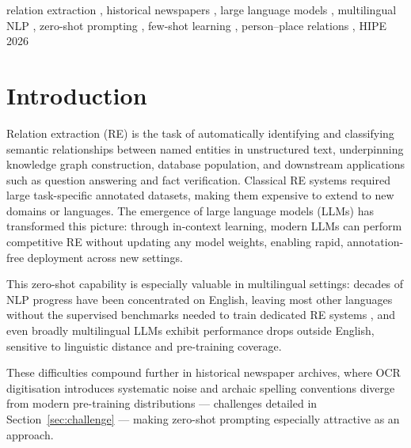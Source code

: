 \documentclass[
]{ceurart}
\theoremstyle{definition}
\begin{document}
\begin{keywords}
  relation extraction \sep
  historical newspapers \sep
  large language models \sep
  multilingual NLP \sep
  zero-shot prompting \sep
  few-shot learning \sep
  person--place relations \sep
  HIPE 2026
\end{keywords}

\maketitle
\thispagestyle{empty}

\section{Introduction}

Relation extraction (RE) is the task of automatically identifying and classifying semantic relationships between named entities in unstructured text, underpinning knowledge graph construction, database population, and downstream applications such as question answering and fact verification.
Classical RE systems required large task-specific annotated datasets, making them expensive to extend to new domains or languages.
The emergence of large language models (LLMs) has transformed this picture: through in-context learning, modern LLMs can perform competitive RE without updating any model weights, enabling rapid, annotation-free deployment across new settings.

This zero-shot capability is especially valuable in multilingual settings: decades of NLP progress have been concentrated on English, leaving most other languages without the supervised benchmarks needed to train dedicated RE systems \citep{joshi-etal-2020-state}, and even broadly multilingual LLMs exhibit performance drops outside English, sensitive to linguistic distance and pre-training coverage.

These difficulties compound further in historical newspaper archives, where OCR digitisation introduces systematic noise and archaic spelling conventions diverge from modern pre-training distributions --- challenges detailed in Section~\ref{sec:challenge} --- making zero-shot prompting especially attractive as an approach.
\end{document}
